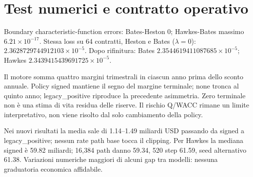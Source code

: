 \documentclass[10pt,a4paper]{article}
\begin{document}
\section{Test numerici e contratto operativo}
Boundary characteristic-function errors: Bates-Heston 0; Hawkes-Bates massimo $6.21\times10^{-17}$. Stessa loss su 64 contratti, Heston e Bates ($\lambda=0$): $2.3628729744912103\times10^{-5}$. Dopo rifinitura: Bates $2.3544619411087685\times10^{-5}$; Hawkes $2.3439415439691725\times10^{-5}$.
\par Il motore somma quattro margini trimestrali in ciascun anno prima dello sconto annuale. Policy signed mantiene il segno del margine terminale; none tronca al quinto anno; legacy\_positive riproduce la precedente asimmetria. Zero terminale non è una stima di vita residua delle riserve. Il rischio Q/WACC rimane un limite interpretativo, non viene risolto dal solo cambiamento della policy.
\par Nei nuovi risultati la media sale di 1.14--1.49 miliardi USD passando da signed a legacy\_positive; nessun rate path base tocca il clipping. Per Hawkes la mediana signed è 59.82 miliardi; 16,384 path danno 59.34, 520 step 61.59, seed alternativo 61.38. Variazioni numeriche maggiori di alcuni gap tra modelli: nessuna graduatoria economica affidabile.
\end{document}
